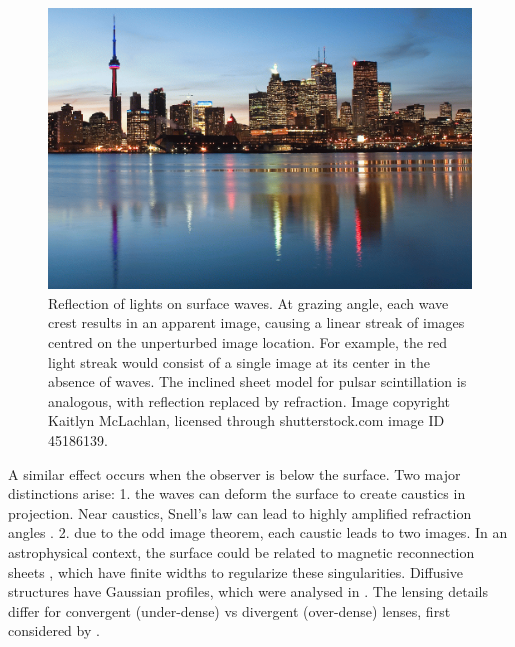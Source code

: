 \documentclass[useAMS,usenatbib]{mn2e}
\begin{document}
\begin{figure}
\centering
\includegraphics[width=1.0\linewidth, angle=0]{toronto-skyline.png}
\caption{Reflection of lights on surface waves.  At grazing angle,
 each wave crest results in an apparent image, causing a linear
 streak of images centred on the unperturbed image location.  For
 example, the red light streak would consist of a single image at its
 center in the absence of waves. The inclined sheet model for  pulsar
 scintillation is analogous, with reflection replaced by refraction.
Image copyright Kaitlyn McLachlan,
 licensed through shutterstock.com image ID 45186139.}
\label{fig:water_reflection}
\end{figure}


A similar effect occurs when the
observer is below the surface.  Two major distinctions arise: 1. the
waves can deform the surface to create caustics in projection. Near
caustics, Snell's law can lead to highly amplified refraction
angles \citep{2006ApJ...640L.159G}.  2. due to the odd image theorem, each caustic leads to two
images.  In an astrophysical context, the surface could be related to
magnetic reconnection 
sheets \citep{2015MNRAS.450.3201B}, which have finite widths to
regularize these singularities.  Diffusive structures have Gaussian
profiles, which were analysed in \citet{2012MNRAS.421L.132P}.  The
lensing details differ for convergent (under-dense) vs divergent
(over-dense) lenses, first considered by \citet{1998ApJ...496..253C}.
\end{document}
